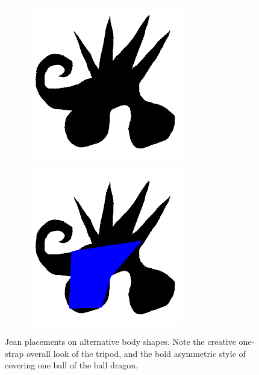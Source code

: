 \documentclass[twocolumn]{article}
\begin{document}
\begin{figure}
    \begin{subfigure}{0.23\textwidth}
        \includegraphics[width=0.92\linewidth]{img/balldragon/target.png}
    \end{subfigure}
    \begin{subfigure}{0.23\textwidth}
        \includegraphics[width=0.92\linewidth]{img/balldragon/iter_99.png}
    \end{subfigure}
    
    \caption{Jean placements on alternative body shapes. Note the creative one-strap overall look of the tripod, and the bold asymmetric style of covering one ball of the ball dragon.}
    \label{fig:others}
\end{figure}
\end{document}
